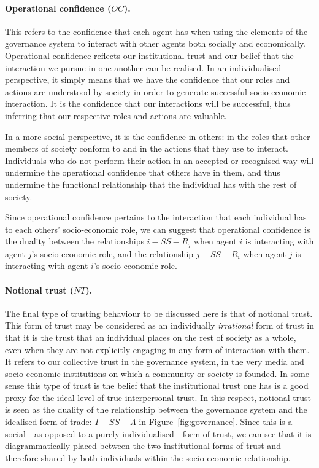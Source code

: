 \begin{subappendices}
\paragraph{Operational confidence ($OC$).}

This refers to the confidence that each agent has when using the elements of the governance system to interact with other agents both socially and economically. Operational confidence reflects our institutional trust and our belief that the interaction we pursue in one another can be realised. In an individualised perspective, it simply means that we have the confidence that our roles and actions are understood by society in order to generate successful socio-economic interaction. It is the confidence that our interactions will be successful, thus inferring that our respective roles and actions are valuable.

In a more social perspective, it is the confidence in others: in the roles that other members of society conform to and in the actions that they use to interact. Individuals who do not perform their action in an accepted or recognised way will undermine the operational confidence that others have in them, and thus undermine the functional relationship that the individual has with the rest of society.

Since operational confidence pertains to the interaction that each individual has to each others' socio-economic role, we can suggest that operational confidence is the duality between the relationships $i-SS-R_{j}$ when agent $i$ is interacting with agent $j$'s socio-economic role, and the relationship $j-SS-R_{i}$ when agent $j$ is interacting with agent $i$'s socio-economic role.

\paragraph{Notional trust ($NT$).}

The final type of trusting behaviour to be discussed here is that of notional trust. This form of trust may be considered as an individually \textit{irrational} form of trust in that it is the trust that an individual places on the rest of society as a whole, even when they are not explicitly engaging in any form of interaction with them. It refers to our collective trust in the governance system, in the very media and socio-economic institutions on which a community or society is founded. In some sense this type of trust is the belief that the institutional trust one has is a good proxy for the ideal level of true interpersonal trust. In this respect, notional trust is seen as the duality of the relationship between the governance system and the idealised form of trade: $I-SS-\Lambda$ in Figure~\ref{fig:governance}. Since this is a social---as opposed to a purely individualised---form of trust, we can see that it is diagrammatically placed between the two institutional forms of trust and therefore shared by both individuals within the socio-economic relationship.


\end{subappendices}
